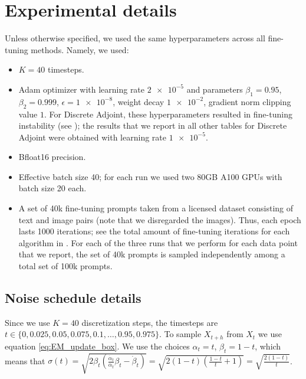 \section{Experimental details}
\label{sec:experimental_details}

Unless otherwise specified, we used the same hyperparameters across all fine-tuning methods. Namely, we used:
\begin{itemize}
    \item $K=40$ timesteps.
    \item Adam optimizer with learning rate $\num{2e-5}$ and parameters $\beta_1 = 0.95$, $\beta_2 = 0.999$, $\epsilon=\num{1e-8}$, weight decay $\num{1e-2}$, gradient norm clipping value $1$. For Discrete Adjoint, these hyperparameters resulted in fine-tuning instability (see ); the results that we report in all other tables for Discrete Adjoint were obtained with learning rate $\num{1e-5}$.
    \item Bfloat16 precision.
    \item Effective batch size 40; for each run we used two 80GB A100 GPUs with batch size 20 each.
    \item A set of 40k fine-tuning prompts taken from a licensed dataset consisting of text and image pairs (note that we disregarded the images). Thus, each epoch lasts 1000 iterations; see the total amount of fine-tuning iterations for each algorithm in . For each of the three runs that we perform for each data point that we report, the set of 40k prompts is sampled independently among a total set of 100k prompts.
\end{itemize}

\subsection{Noise schedule details} \label{subsec:noise_schedule}
Since we use $K=40$ discretization steps, the timesteps are $t \in \{0, 0.025, 0.05, 0.075, 0.1, \dots, 0.95, 0.975\}$. To sample $X_{t+h}$ from $X_t$ we use equation \eqref{eq:EM_update_box}. We use the choices $\alpha_t = t$, $\beta_t = 1-t$, which means that $\sigma(t) = \sqrt{2 \beta_t (\frac{\dot{\alpha}_t}{\alpha_t} \beta_t - \dot{\beta}_t)} = \sqrt{2 (1-t) (\frac{1-t}{t} + 1)} = \sqrt{\frac{2 (1-t)}{t}}$. 

